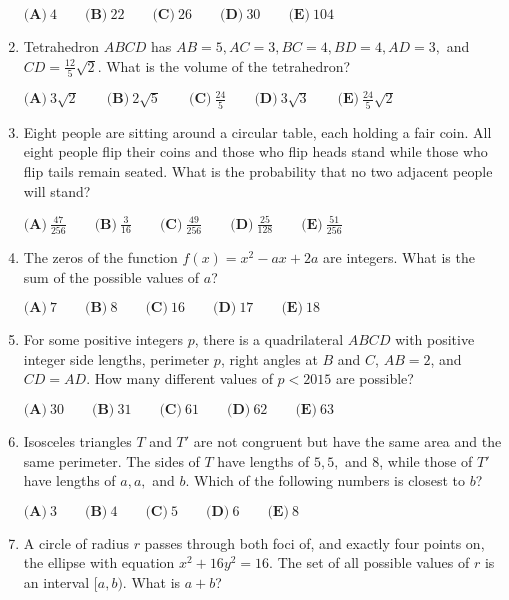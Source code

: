 \documentclass{article}
\begin{document}
\begin{enumerate}[label=\arabic*., itemsep=0.5em]
$ \textbf{(A)}\ 4\qquad\textbf{(B)}\ 22\qquad\textbf{(C)}\ 26\qquad\textbf{(D)}\ 30\qquad\textbf{(E)}\ 104$\par \vspace{0.5em}\item Tetrahedron $ABCD$ has $AB=5,AC=3,BC=4,BD=4,AD=3,$ and $CD=\frac{12}{5}\sqrt{2}$. What is the volume of the tetrahedron?

$ \textbf{(A)}\ 3\sqrt{2}\qquad\textbf{(B)}\ 2\sqrt{5}\qquad\textbf{(C)}\ \frac{24}{5}\qquad\textbf{(D)}\ 3\sqrt{3}\qquad\textbf{(E)}\ \frac{24}{5}\sqrt{2}$\par \vspace{0.5em}\item Eight people are sitting around a circular table, each holding a fair coin. All eight people flip their coins and those who flip heads stand while those who flip tails remain seated. What is the probability that no two adjacent people will stand?

$ \textbf{(A)}\ \frac{47}{256} \qquad\textbf{(B)}\ \frac{3}{16} \qquad\textbf{(C)}\ \frac{49}{256} \qquad\textbf{(D)}\ \frac{25}{128} \qquad\textbf{(E)}\ \frac{51}{256}$\par \vspace{0.5em}\item The zeros of the function $f(x) = x^2-ax+2a$ are integers. What is the sum of the possible values of $a$?

$ \textbf{(A)}\ 7 \qquad\textbf{(B)}\ 8 \qquad\textbf{(C)}\ 16 \qquad\textbf{(D)}\ 17 \qquad\textbf{(E)}\ 18$\par \vspace{0.5em}\item For some positive integers $p$, there is a quadrilateral $ABCD$ with positive integer side lengths, perimeter $p$, right angles at $B$ and $C$, $AB=2$, and $CD=AD$. How many different values of $p<2015$ are possible?

$ \textbf{(A)}\ 30 \qquad\textbf{(B)}\ 31 \qquad\textbf{(C)}\ 61 \qquad\textbf{(D)}\ 62 \qquad\textbf{(E)}\ 63$\par \vspace{0.5em}\item Isosceles triangles $T$ and $T'$ are not congruent but have the same area and the same perimeter. The sides of $T$ have lengths of $5,5,$ and $8$, while those of $T'$ have lengths of $a,a,$ and $b$. Which of the following numbers is closest to $b$?

$ \textbf{(A)}\ 3 \qquad\textbf{(B)}\ 4 \qquad\textbf{(C)}\ 5 \qquad\textbf{(D)}\ 6 \qquad\textbf{(E)}\ 8$\par \vspace{0.5em}\item A circle of radius $r$ passes through both foci of, and exactly four points on, the ellipse with equation $x^2+16y^2=16$. The set of all possible values of $r$ is an interval $[a,b)$. What is $a+b$?


\end{enumerate}
\end{document}
